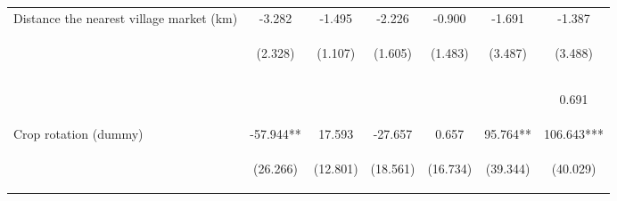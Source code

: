 \begin{center}
\begin{tabular}{lcccccc}
Distance the nearest village market (km) & -3.282 & -1.495 & -2.226 & -0.900 & -1.691 & -1.387 \\
 & \begin{footnotesize}(2.328)\end{footnotesize} & \begin{footnotesize}(1.107)\end{footnotesize} & \begin{footnotesize}(1.605)\end{footnotesize} & \begin{footnotesize}(1.483)\end{footnotesize} & \begin{footnotesize}(3.487)\end{footnotesize} & \begin{footnotesize}(3.488)\end{footnotesize} \\
\vspace{4pt} & \begin{footnotesize}[0.159]\end{footnotesize} & \begin{footnotesize}[0.177]\end{footnotesize} & \begin{footnotesize}[0.166]\end{footnotesize} & \begin{footnotesize}[0.544]\end{footnotesize} & \begin{footnotesize}[0.628]\end{footnotesize} & \begin{footnotesize}0.691\end{footnotesize} \\
Crop rotation (dummy) & -57.944** & 17.593 & -27.657 & 0.657 & 95.764** & 106.643*** \\
 & \begin{footnotesize}(26.266)\end{footnotesize} & \begin{footnotesize}(12.801)\end{footnotesize} & \begin{footnotesize}(18.561)\end{footnotesize} & \begin{footnotesize}(16.734)\end{footnotesize} & \begin{footnotesize}(39.344)\end{footnotesize} & \begin{footnotesize}(40.029)\end{footnotesize} \\

\end{tabular}
\end{center}
